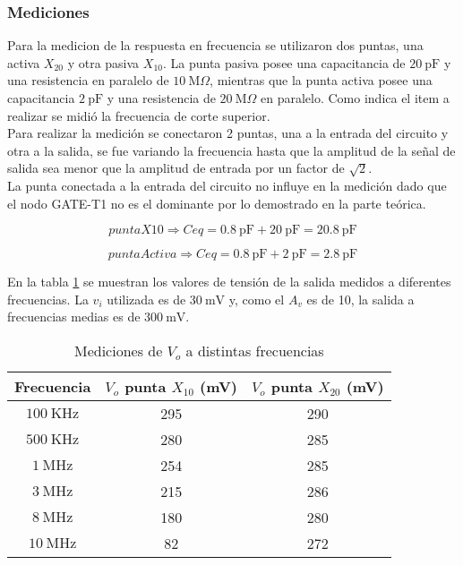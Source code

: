 \documentclass[a4paper,10pt]{article}
\begin{document}
			\subsubsection{Mediciones}
				\indent Para la medicion de la respuesta en frecuencia se utilizaron dos puntas, una activa $X_{20}$ y otra pasiva $X_{10}$. La punta pasiva posee una 
				capacitancia de $20~\text{pF}$ y una resistencia en paralelo de $10~\text{M}\Omega$, mientras que la punta activa posee una capacitancia $2~\text{pF}$ 
				y una resistencia de $20~\text{M}\Omega$ en paralelo. Como indica el item a realizar se midió la frecuencia de corte superior. \\
				
				\indent Para realizar la medición se conectaron 2 puntas, una a la entrada del circuito y otra a la salida, se fue variando la frecuencia hasta que la 
				amplitud de la señal de salida sea menor que la amplitud de entrada por un factor de $\sqrt{2}$. \\
				\indent La punta conectada a la entrada del circuito no influye en la medición dado que el nodo GATE-T1 no es el dominante por lo demostrado en la 
				parte teórica. 

				\begin{displaymath}
					punta X10 \Rightarrow Ceq=0.8~\text{pF}+20~\text{pF}=20.8~\text{pF}
				\end{displaymath}	

		    \begin{displaymath}
					punta Activa \Rightarrow Ceq=0.8~\text{pF}+2~\text{pF}=2.8~\text{pF}	
				\end{displaymath}

				En la tabla \ref{tab006} se muestran los valores de tensión de la salida medidos a diferentes frecuencias. La $v_i$ utilizada es de $30~\text{mV}$ 
				y, como el $A_v$ es de 10, la salida a frecuencias medias es de $300~\text{mV}$.
			
				\begin{table}[!htb]
				\centering
					\begin{tabular}{|c|c|c|}
						\hline
						Frecuencia & $V_o$ punta $X_{10}$ (mV) & $V_o$ punta $X_{20}$ (mV) \\
						\hline
						$100~\text{KHz}$ & 295 & 290 \\
						\hline
						$500~\text{KHz}$ & 280 & 285 \\
						\hline
						$1~\text{MHz}$ & 254 & 285 \\
						\hline
						$3~\text{MHz}$ & 215 & 286 \\
						\hline
						$8~\text{MHz}$ & 180 & 280 \\
						\hline
						$10~\text{MHz}$ & 82 & 272 \\
						\hline
					\end{tabular}
				\caption{Mediciones de $V_o$ a distintas frecuencias} \label{tab006}
				\end{table}			
			
\end{document}
